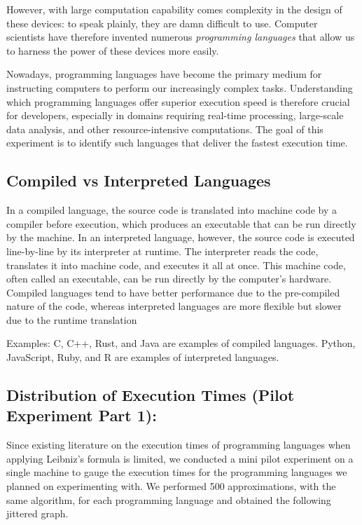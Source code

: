 \documentclass[12pt,halfline,a4paper,]{ouparticle}
\begin{document}
However, with large computation capability comes complexity in the
design of these devices: to speak plainly, they are damn difficult to
use. Computer scientists have therefore invented numerous
\emph{programming languages} that allow us to harness the power of these
devices more easily.

Nowadays, programming languages have become the primary medium for
instructing computers to perform our increasingly complex tasks.
Understanding which programming languages offer superior execution speed
is therefore crucial for developers, especially in domains requiring
real-time processing, large-scale data analysis, and other
resource-intensive computations. The goal of this experiment is to
identify such languages that deliver the fastest execution time.

\subsection{Compiled vs Interpreted
Languages}\label{compiled-vs-interpreted-languages}

In a compiled language, the source code is translated into machine code
by a compiler before execution, which produces an executable that can be
run directly by the machine. In an interpreted language, however, the
source code is executed line-by-line by its interpreter at runtime. The
interpreter reads the code, translates it into machine code, and
executes it all at once. This machine code, often called an executable,
can be run directly by the computer's hardware. Compiled languages tend
to have better performance due to the pre-compiled nature of the code,
whereas interpreted languages are more flexible but slower due to the
runtime translation

Examples: C, C++, Rust, and Java are examples of compiled languages.
Python, JavaScript, Ruby, and R are examples of interpreted languages.
\newpage

\subsection{Distribution of Execution Times (Pilot Experiment Part
1):}\label{distribution-of-execution-times-pilot-experiment-part-1}

Since existing literature on the execution times of programming
languages when applying Leibniz's formula is limited, we conducted a
mini pilot experiment on a single machine to gauge the execution times
for the programming languages we planned on experimenting with. We
performed 500 approximations, with the same algorithm, for each
programming language and obtained the following jittered graph.
\end{document}
